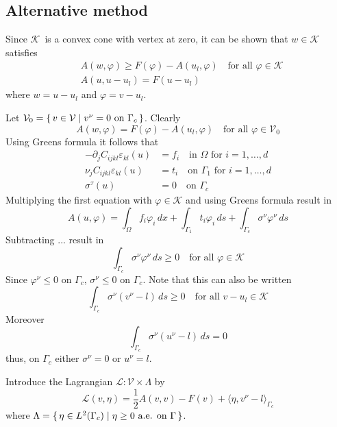 \documentclass[12pt,a4paper]{article}
\numberwithin{equation}{section}
\numberwithin{table}{section}
\numberwithin{figure}{section}
\newcommand{\half}{\ensuremath{\frac{1}{2}}}
\newcommand{\pd}[1]{\ensuremath{\partial_{#1}}}
\renewcommand{\dj}{\pd{j}}
\newcommand{\V}{\ensuremath{\mathcal{V}}}
\newcommand{\K}{\ensuremath{\mathcal{K}}}
\newcommand{\Lagrange}{\ensuremath{\mathcal L}}
\newcommand{\intO}{\int_\Omega\!\!}
\newcommand{\intG}[1][0]{\int_{\Gamma_{#1}}\!\!}
\newcommand{\intGc}{\intG[c]}
\renewcommand{\epsilon}{\varepsilon}
\renewcommand{\phi}{\varphi}
\newcommand{\strain}[1][]{\ensuremath{\epsilon_{#1}}}
\newcommand{\epskl}{\strain[kl]}
\providecommand{\dualp}[2]{\langle #1, #2 \rangle}
\newcommand{\dx}{{\,dx}}
\newcommand{\ds}{{\,ds}}
\renewcommand{\forall}{\text{for all }}
\newcommand{\qforall}{\quad\text{for all }}
\begin{document}
\subsection{Alternative method}

Since \K\ is a convex cone with vertex at zero, it can be shown that $w\in \K$
satisfies
\begin{align}
  &A(w,\phi) \ge F(\phi) - A(u_l,\phi) \quad\forall{\phi\in \K} \\
  &A(u,u-u_l)  = F(u-u_l)
\end{align}
where $w=u-u_l$ and $\phi=v-u_l$.

Let $\V_0 = \set{v\in \V | v^\nu = 0 \text{ on }\Gamma_c}$. Clearly
\begin{equation}
  A(w,\phi) = F(\phi) - A(u_l, \phi) \quad\forall{\phi\in\V_0}
\end{equation}
Using Greens formula it follows that
\begin{align}
  \label{eq:elasteq}
  -\dj C_{ijkl}\epskl(u) &= f_i \quad\text{in $\Omega$ for $i=1,\ldots,d$} \\
  \nu_j C_{ijkl}\epskl(u) &= t_i \quad\text{on $\Gamma_1$ for $i=1,\ldots,d$} \\
  \sigma^\tau(u) &= 0 \quad\text{on $\Gamma_c$}
\end{align}
Multiplying the first equation with $\phi\in \K$ and using Greens formula result in
\begin{equation}
  A(u,\phi) = \intO f_i \phi_i\dx + \intG[1] t_i \phi_i \ds
  + \intGc \sigma^\nu \phi^\nu \ds
\end{equation}
Subtracting ... result in 
\begin{equation}
  \intGc \sigma^\nu \phi^\nu \ds \ge 0 \qforall \phi\in\K
\end{equation}
Since $\phi^\nu\le 0$ on $\Gamma_c$, $\sigma^\nu \le 0$ on $\Gamma_c$. Note that this can
also be written
\begin{equation}
  \intGc \sigma^\nu (v^\nu-l) \ds \ge 0 \qforall v-u_l\in\K
\end{equation}
Moreover
\begin{equation}
  \intGc \sigma^\nu (u^\nu - l) \ds = 0
\end{equation}
thus, on $\Gamma_c$ either $\sigma^\nu = 0$ or $u^\nu = l$.

Introduce the Lagrangian $\Lagrange:\V\times \Lambda$ by
\begin{equation}
  \Lagrange(v,\eta) = \half A(v,v) - F(v) + \dualp{\eta}{v^\nu-l}_{\Gamma_c}
\end{equation}
where $\Lambda=\set{\eta\in L^2(\Gamma_c) | \eta \ge 0 \text{ a.e. on }\Gamma}$.
\end{document}
